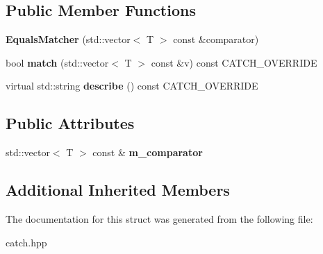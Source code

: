 \subsection*{Public Member Functions}
\begin{DoxyCompactItemize}
\item 
\mbox{\label{structCatch_1_1Matchers_1_1Vector_1_1EqualsMatcher_a3846c47780d1991dcfe87aefded98008}} 
{\bfseries Equals\+Matcher} (std\+::vector$<$ T $>$ const \&comparator)
\item 
\mbox{\label{structCatch_1_1Matchers_1_1Vector_1_1EqualsMatcher_aca444c319d1b4c6f538faf9c4735da04}} 
bool {\bfseries match} (std\+::vector$<$ T $>$ const \&v) const C\+A\+T\+C\+H\+\_\+\+O\+V\+E\+R\+R\+I\+DE
\item 
\mbox{\label{structCatch_1_1Matchers_1_1Vector_1_1EqualsMatcher_aca79ade26f4a75b2a57005067e086e35}} 
virtual std\+::string {\bfseries describe} () const C\+A\+T\+C\+H\+\_\+\+O\+V\+E\+R\+R\+I\+DE
\end{DoxyCompactItemize}
\subsection*{Public Attributes}
\begin{DoxyCompactItemize}
\item 
\mbox{\label{structCatch_1_1Matchers_1_1Vector_1_1EqualsMatcher_a56f7aa6f110a12b1b9aeb0cabbc9d755}} 
std\+::vector$<$ T $>$ const  \& {\bfseries m\+\_\+comparator}
\end{DoxyCompactItemize}
\subsection*{Additional Inherited Members}


The documentation for this struct was generated from the following file\+:\begin{DoxyCompactItemize}
\item 
catch.\+hpp\end{DoxyCompactItemize}
